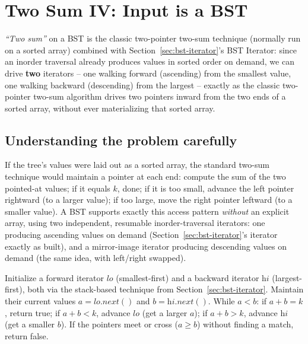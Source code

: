 \section{Two Sum IV: Input is a BST}
\label{sec:bst-two-sum}


\begin{patternbox}
\emph{``Two sum''} on a BST is the classic two-pointer two-sum technique
(normally run on a sorted array) combined with
Section~\ref{sec:bst-iterator}'s BST Iterator: since an inorder traversal
already produces values in sorted order on demand, we can drive
\textbf{two} iterators -- one walking forward (ascending) from the
smallest value, one walking backward (descending) from the largest --
exactly as the classic two-pointer two-sum algorithm drives two pointers
inward from the two ends of a sorted array, without ever materializing
that sorted array.
\end{patternbox}

\subsection*{Understanding the problem carefully}

If the tree's values were laid out as a sorted array, the standard
two-sum technique would maintain a pointer at each end: compute the sum
of the two pointed-at values; if it equals $k$, done; if it is too
small, advance the left pointer rightward (to a larger value); if too
large, move the right pointer leftward (to a smaller value). A BST
supports exactly this access pattern \emph{without} an explicit array,
using two independent, resumable inorder-traversal iterators: one
producing ascending values on demand (Section~\ref{sec:bst-iterator}'s
iterator exactly as built), and a mirror-image iterator producing
descending values on demand (the same idea, with left/right swapped).

\begin{ideabox}
Initialize a forward iterator $\textit{lo}$ (smallest-first) and a
backward iterator $\textit{hi}$ (largest-first), both via the stack-based
technique from Section~\ref{sec:bst-iterator}. Maintain their current
values $a = \textit{lo}.\textit{next}()$ and $b =
\textit{hi}.\textit{next}()$. While $a < b$: if $a+b=k$, return true; if
$a+b<k$, advance $\textit{lo}$ (get a larger $a$); if $a+b>k$, advance
$\textit{hi}$ (get a smaller $b$). If the pointers meet or cross ($a \ge
b$) without finding a match, return false.
\end{ideabox}

